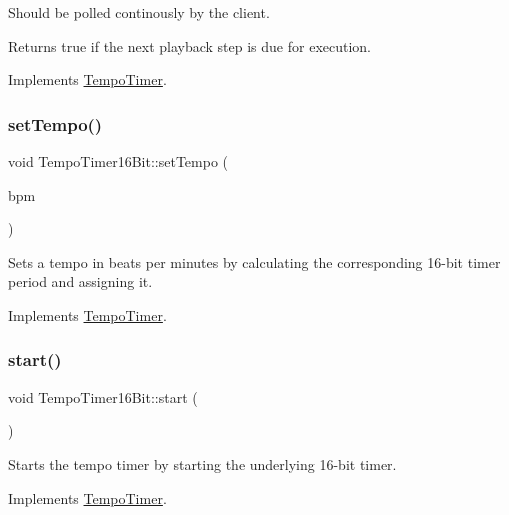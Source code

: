 Should be polled continously by the client. \begin{DoxyReturn}{Returns}
true if the next playback step is due for execution. 
\end{DoxyReturn}


Implements \mbox{\hyperlink{class_tempo_timer}{Tempo\+Timer}}.

\mbox{\label{class_tempo_timer16_bit_adbd6f0e4af015b240e65109a128988a4}} 
\subsubsection{\texorpdfstring{set\+Tempo()}{setTempo()}}
{\footnotesize\ttfamily void Tempo\+Timer16\+Bit\+::set\+Tempo (\begin{DoxyParamCaption}\item[{\mbox{\hyperlink{class_beats_per_minute}{Beats\+Per\+Minute}}}]{bpm }\end{DoxyParamCaption})\hspace{0.3cm}{\ttfamily [virtual]}}

Sets a tempo in beats per minutes by calculating the corresponding 16-\/bit timer period and assigning it. 

Implements \mbox{\hyperlink{class_tempo_timer}{Tempo\+Timer}}.

\mbox{\label{class_tempo_timer16_bit_a84b46988dda79e20172382417966de13}} 
\subsubsection{\texorpdfstring{start()}{start()}}
{\footnotesize\ttfamily void Tempo\+Timer16\+Bit\+::start (\begin{DoxyParamCaption}{ }\end{DoxyParamCaption})\hspace{0.3cm}{\ttfamily [virtual]}}

Starts the tempo timer by starting the underlying 16-\/bit timer. 

Implements \mbox{\hyperlink{class_tempo_timer}{Tempo\+Timer}}.

\mbox{\label{class_tempo_timer16_bit_a1f5d42ac7fe24317a0c04484bbf345c6}} 
